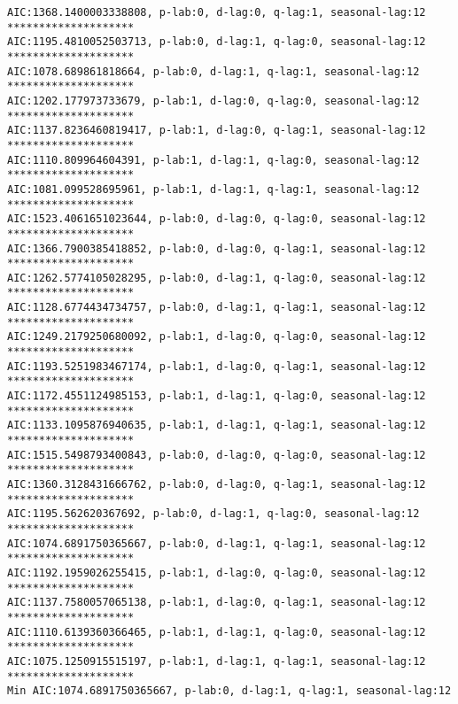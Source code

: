 \documentclass[11pt]{article}
\begin{document}
\begin{Verbatim}[commandchars=\\\{\}]
AIC:1368.1400003338808, p-lab:0, d-lag:0, q-lag:1, seasonal-lag:12
********************
AIC:1195.4810052503713, p-lab:0, d-lag:1, q-lag:0, seasonal-lag:12
********************
AIC:1078.689861818664, p-lab:0, d-lag:1, q-lag:1, seasonal-lag:12
********************
AIC:1202.177973733679, p-lab:1, d-lag:0, q-lag:0, seasonal-lag:12
********************
AIC:1137.8236460819417, p-lab:1, d-lag:0, q-lag:1, seasonal-lag:12
********************
AIC:1110.809964604391, p-lab:1, d-lag:1, q-lag:0, seasonal-lag:12
********************
AIC:1081.099528695961, p-lab:1, d-lag:1, q-lag:1, seasonal-lag:12
********************
AIC:1523.4061651023644, p-lab:0, d-lag:0, q-lag:0, seasonal-lag:12
********************
AIC:1366.7900385418852, p-lab:0, d-lag:0, q-lag:1, seasonal-lag:12
********************
AIC:1262.5774105028295, p-lab:0, d-lag:1, q-lag:0, seasonal-lag:12
********************
AIC:1128.6774434734757, p-lab:0, d-lag:1, q-lag:1, seasonal-lag:12
********************
AIC:1249.2179250680092, p-lab:1, d-lag:0, q-lag:0, seasonal-lag:12
********************
AIC:1193.5251983467174, p-lab:1, d-lag:0, q-lag:1, seasonal-lag:12
********************
AIC:1172.4551124985153, p-lab:1, d-lag:1, q-lag:0, seasonal-lag:12
********************
AIC:1133.1095876940635, p-lab:1, d-lag:1, q-lag:1, seasonal-lag:12
********************
AIC:1515.5498793400843, p-lab:0, d-lag:0, q-lag:0, seasonal-lag:12
********************
AIC:1360.3128431666762, p-lab:0, d-lag:0, q-lag:1, seasonal-lag:12
********************
AIC:1195.562620367692, p-lab:0, d-lag:1, q-lag:0, seasonal-lag:12
********************
AIC:1074.6891750365667, p-lab:0, d-lag:1, q-lag:1, seasonal-lag:12
********************
AIC:1192.1959026255415, p-lab:1, d-lag:0, q-lag:0, seasonal-lag:12
********************
AIC:1137.7580057065138, p-lab:1, d-lag:0, q-lag:1, seasonal-lag:12
********************
AIC:1110.6139360366465, p-lab:1, d-lag:1, q-lag:0, seasonal-lag:12
********************
AIC:1075.1250915515197, p-lab:1, d-lag:1, q-lag:1, seasonal-lag:12
********************
Min AIC:1074.6891750365667, p-lab:0, d-lag:1, q-lag:1, seasonal-lag:12

    \end{Verbatim}

    \begin{center}
    \end{center}
    { \hspace*{\fill} \\}
    
    \begin{center}
    \end{center}
    { \hspace*{\fill} \\}
    
\end{document}
